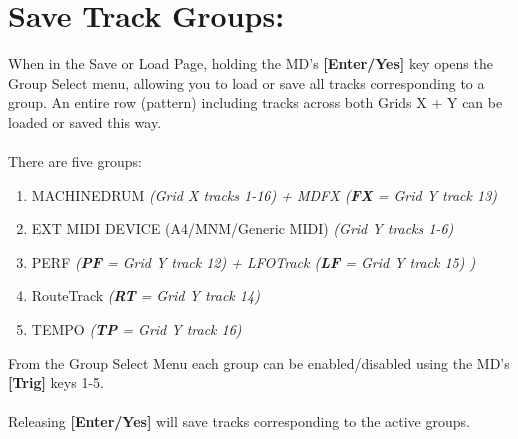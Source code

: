 \section{Save Track Groups:}
When in the Save or Load Page, holding the MD's \textbf{[Enter/Yes]} key opens the Group Select menu, allowing you to load or save all tracks corresponding to a group. An entire row (pattern) including tracks across both Grids X + Y can be loaded or saved this way.\\\\
There are five groups:
\begin{enumerate}
    \item MACHINEDRUM \textit{(Grid X tracks 1-16) + MDFX (\textbf{FX} = Grid Y track 13)}
    \item EXT MIDI DEVICE (A4/MNM/Generic MIDI) \textit{(Grid Y tracks 1-6)}
    \item PERF \textit{(\textbf{PF} = Grid Y track 12) + LFOTrack (\textbf{LF }= Grid Y track 15) )}
    \item  RouteTrack \textit{(\textbf{RT} = Grid Y track 14) }
    \item TEMPO \textit{(\textbf{TP} = Grid Y track 16)}
\end{enumerate}
From the Group Select Menu each group can be enabled/disabled using the MD's \textbf{[Trig]} keys 1-5. \\
\\
Releasing \textbf{[Enter/Yes]} will save tracks corresponding to the active groups.


